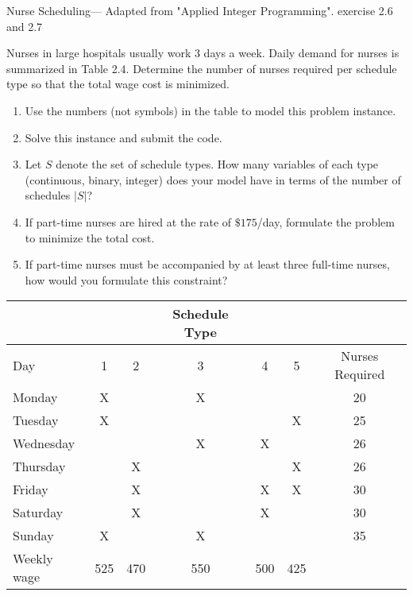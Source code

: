 \documentclass[../open-optimization/open-optimization.tex]{subfiles}
\begin{document}
\begin{example}{Nurse Scheduling}{--- Adapted from "Applied Integer Programming". exercise 2.6 and 2.7}
\end{example}
Nurses in large hospitals usually work 3 days a week. Daily demand for nurses is summarized in Table 2.4. Determine the number of nurses required per schedule type so that the total wage cost is minimized.
\begin{enumerate}
\item  Use the numbers (not symbols) in the table to model this problem instance.
\item Solve this instance and submit the code.
\item Let $S$ denote the set of schedule types.  How many variables of each type (continuous, binary, integer) does your model have in terms of the number of schedules $|S|$?
\item If part-time nurses are hired at the rate of $\$175$/day, formulate the problem to minimize the total cost. 
\item If part-time nurses must be accompanied by at least three full-time nurses, how would you formulate this constraint?
\end{enumerate}
\begin{table}[h]
\begin{center}
\begin{tabular}{l|ccccc|c}
\hline
\hline
& & & Schedule Type & & \\
\hline
Day & 1 & 2 & 3 & 4 & 5 & Nurses Required\\
\hline
Monday & X & & X & & & 20\\
Tuesday & X & &  &  & X & 25\\
Wednesday & & & X & X & & 26\\
Thursday& & X & & & X& 26\\
Friday & & X & & X & X & 30\\
Saturday& & X& & X& & 30\\
Sunday& X& & X & && 35\\
\hline
Weekly wage& 525 & 470 & 550 & 500 & 425\\
\hline 
\hline
\end{tabular}
\end{center}
\end{table}
\end{document}
